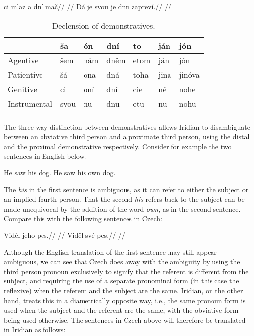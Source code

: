 \pex
\a{}
\begingl
\gla ci mlaz a dní mač//
\glft {}//
\endgl
\a{}
\begingl
\gla Dá je svou je dnu zapreví.//
\glft {}//
\endgl
\xe

\begin{table}
\footnotesize\sffamily
	\caption{Declension of demonstratives.}
    \medskip
	\begin{tabu}to 
		\toprule
						& {ša}	& {ón}	&{dní}& {to}	& {ján}	&{jón}\\
		\midrule \addlinespace
		Agentive&šem&nám&dněm&etom&ján&jón\\\addlinespace
		Patientive&šá&ona&dná&toha&jina&jinóva\\\addlinespace
		Genitive&ci&oní&dní&cie&ně&nohe\\\addlinespace
		Instrumental&svou&nu&dnu&etu&nu&nohu\\\addlinespace
		\bottomrule
		\label{dem-conj}
	\end{tabu}
\end{table}

The three-way distinction between demonstratives allows Iridian to disambiguate between an obviative third person and a proximate third person, using the distal and the proximal demonstrative respectively. Consider for example the two sentences in English below:

\pex
\a He saw his dog.
\a He saw his own dog.\smallskip
\xe

The \emph{his} in the first sentence is ambiguous, as it can refer to either the subject or an implied fourth person. That the second \emph{his} refers back to the subject can be made unequivocal by the addition of the word \emph{own}, as in the second sentence. Compare this with the following sentences in Czech:

\begin{multicols}{2}
  \pex
  \a
  \begingl
  \gla Viděl jeho pes.//
  \glft {}//
  \endgl
  \a \begingl
  \gla Viděl své pes.//
  \glft {}//
  \endgl
  \xe
\end{multicols}

Although the English translation of the first sentence may still appear ambiguous, we can see that Czech does away with the ambiguity by using the third person pronoun  exclusively to signify that the referent is different from the subject, and requiring the use of a separate pronominal form (in this case the reflexive) when the referent and the subject are the same. Iridian, on the other hand, treats this in a diametrically opposite way, i.e., the same pronoun form is used when the subject and the referent are the same, with the obviative form being used otherwise. The sentences in Czech above will therefore be translated in Iridian as follows:

